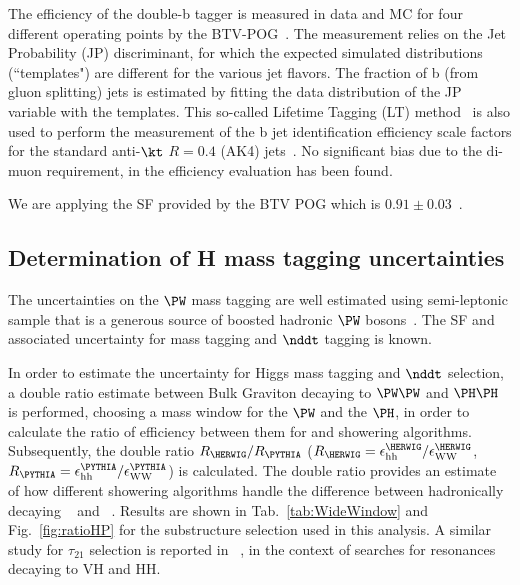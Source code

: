 The efficiency of the double-b tagger is measured in data and MC for four different operating points by the BTV-POG~\cite{CMS-PAS-BTV-15-002}. The measurement relies on the Jet Probability (JP) discriminant, for which the expected simulated distributions (``templates") are different for the various jet flavors. The fraction of b (from gluon splitting) jets is estimated by fitting the data distribution of the JP variable with the templates. This so-called Lifetime Tagging (LT) method~\cite{Chatrchyan:2012jua} is also used to perform the measurement of the b jet identification efficiency scale factors for the standard anti-$\kt$ $R = 0.4$ (AK4) jets~\cite{CMS-PAS-BTV-15-001}. No significant bias due to the di-muon requirement, in the efficiency evaluation has been found. 

We are applying the SF provided by the BTV POG which is $0.91\pm0.03$~\cite{BTV-TWIKI}.


\subsection{Determination of H mass tagging uncertainties \label{HtaggingUnc}}

The uncertainties on the $\PW$ mass tagging are well estimated using semi-leptonic \ttbar sample that is a generous source of boosted hadronic $\PW$ bosons~\cite{CMS-PAS-JME-16-003}. The SF and associated uncertainty for mass tagging and $\nddt$ tagging is known. 

In order to estimate the uncertainty for Higgs mass tagging and $\nddt$ selection, a double ratio estimate between Bulk Graviton decaying to $\PW\PW$ and $\PH\PH$ is performed, choosing a mass window for the $\PW$ and the $\PH$, in order to calculate the ratio of efficiency between them for \PYTHIA and \HERWIG showering algorithms. Subsequently, the double ratio $R_{\HERWIG}/R_{\PYTHIA}$ ($R_{\HERWIG}=\epsilon_{\mathrm{hh}}^{\HERWIG}/\epsilon_{\mathrm{WW}}^{\HERWIG}$, $R_{\PYTHIA}=\epsilon_{\mathrm{hh}}^{\PYTHIA}/\epsilon_{\mathrm{WW}}^{\PYTHIA}$) is calculated. The double ratio provides an estimate of how different showering algorithms handle the difference between hadronically decaying \PW~ and \PH~. Results are shown in Tab.~\ref{tab:WideWindow} and Fig.~\ref{fig:ratioHP} for the substructure selection used in this analysis.
A similar study for $\tau_{21}$ selection is reported in ~\cite{AN-16-377, AN-16-300}, in the context of searches for resonances decaying to VH and HH.

